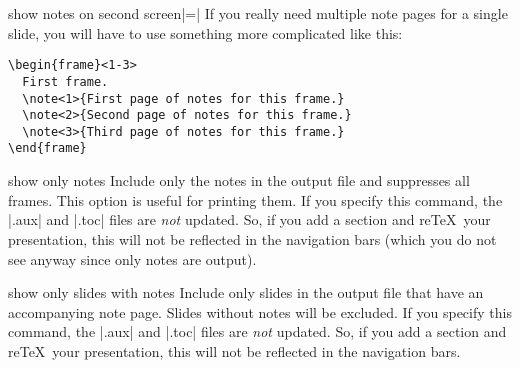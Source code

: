 \begin{beameroption}{show notes on second screen}{|=|}
  If you really need multiple note pages for a single slide, you will have to use something more complicated like this:
\begin{verbatim}
\begin{frame}<1-3>
  First frame.
  \note<1>{First page of notes for this frame.}
  \note<2>{Second page of notes for this frame.}
  \note<3>{Third page of notes for this frame.}
\end{frame}
\end{verbatim}
\end{beameroption}

\begin{beameroption}{show only notes}{}
  Include only the notes in the output file and suppresses all frames. This option is useful for printing them. If you specify this command, the |.aux| and |.toc| files are \emph{not} updated. So, if you add a section and re\TeX\ your presentation, this will not be reflected in the navigation bars (which you do not see anyway since only notes are output).
\end{beameroption}

\begin{beameroption}{show only slides with notes}{}
  Include only slides in the output file that have an accompanying note page. Slides without notes will be excluded. If you specify this command, the |.aux| and |.toc| files are \emph{not} updated. So, if you add a section and re\TeX\ your presentation, this will not be reflected in the navigation bars.
\end{beameroption}
